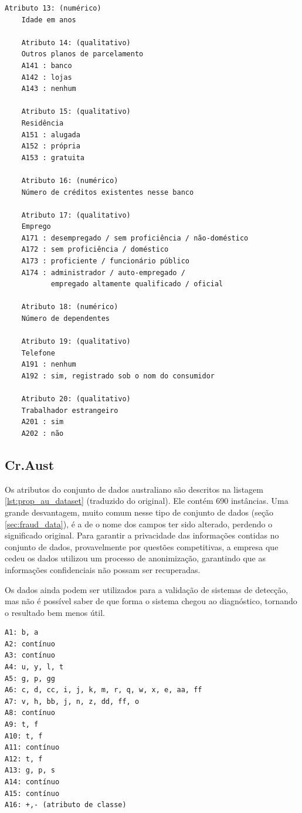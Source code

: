\begin{lstlisting}[caption=Atributos do conjunto de dados alemão,label=lst:ge_dataset]
    Atributo 13: (numérico)
    Idade em anos

    Atributo 14: (qualitativo)
    Outros planos de parcelamento
    A141 : banco
    A142 : lojas
    A143 : nenhum

    Atributo 15: (qualitativo)
    Residência
    A151 : alugada
    A152 : própria
    A153 : gratuita

    Atributo 16: (numérico)
    Número de créditos existentes nesse banco

    Atributo 17: (qualitativo)
    Emprego
    A171 : desempregado / sem proficiência / não-doméstico
    A172 : sem proficiência / doméstico
    A173 : proficiente / funcionário público
    A174 : administrador / auto-empregado /
           empregado altamente qualificado / oficial

    Atributo 18: (numérico)
    Número de dependentes

    Atributo 19: (qualitativo)
    Telefone
    A191 : nenhum
    A192 : sim, registrado sob o nom do consumidor

    Atributo 20: (qualitativo)
    Trabalhador estrangeiro
    A201 : sim
    A202 : não
\end{lstlisting}
\vspace{0.5cm}

\subsection{Cr.Aust}

Os atributos do conjunto de dados australiano são descritos na listagem \ref{lst:prop_au_dataset} (traduzido do original). Ele contém 690 instâncias. Uma grande desvantagem, muito comum nesse tipo de conjunto de dados (seção \ref{sec:fraud_data}), é a de o nome dos campos ter sido alterado, perdendo o significado original. Para garantir a privacidade das informações contidas no conjunto de dados, provavelmente por questões competitivas, a empresa que cedeu os dados utilizou um processo de anonimização, garantindo que as informações confidenciais não possam ser recuperadas.

Os dados ainda podem ser utilizados para a validação de sistemas de detecção, mas não é possível saber de que forma o sistema chegou ao diagnóstico, tornando o resultado bem menos útil.

\vspace{0.5cm}
\begin{lstlisting}[caption=Atributos do conjunto de dados Cr.Aust, label=lst:prop_au_dataset]
A1: b, a
A2: contínuo
A3: contínuo
A4: u, y, l, t
A5: g, p, gg
A6: c, d, cc, i, j, k, m, r, q, w, x, e, aa, ff
A7: v, h, bb, j, n, z, dd, ff, o
A8: contínuo
A9: t, f
A10: t, f
A11: contínuo
A12: t, f
A13: g, p, s
A14: contínuo
A15: contínuo
A16: +,- (atributo de classe)
\end{lstlisting}
\vspace{0.5cm}

